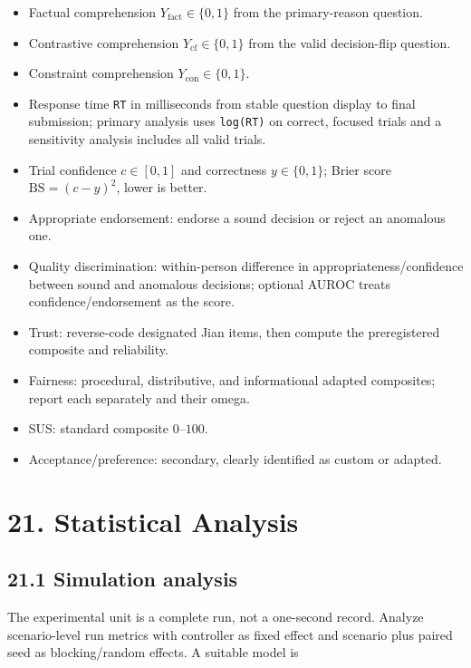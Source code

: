 \documentclass[
  english,
  11pt,
  a4paper,
]{article}
\providecommand{\tightlist}{%
  \setlength{\itemsep}{0pt}\setlength{\parskip}{0pt}}
\begin{document}
\begin{itemize}
\tightlist
\item
  Factual comprehension \(Y_{\mathrm{fact}}\in\{0,1\}\) from the primary-reason
  question.
\item
  Contrastive comprehension \(Y_{\mathrm{cf}}\in\{0,1\}\) from the valid
  decision-flip question.
\item
  Constraint comprehension \(Y_{\mathrm{con}}\in\{0,1\}\).
\item
  Response time \texttt{RT} in milliseconds from stable question display
  to final submission; primary analysis uses \texttt{log(RT)} on
  correct, focused trials and a sensitivity analysis includes all valid
  trials.
\item
  Trial confidence \(c\in[0,1]\) and correctness \(y\in\{0,1\}\); Brier
  score \(\mathrm{BS}=(c-y)^2\), lower is better.
\item
  Appropriate endorsement: endorse a sound decision or reject an
  anomalous one.
\item
  Quality discrimination: within-person difference in
  appropriateness/confidence between sound and anomalous decisions;
  optional AUROC treats confidence/endorsement as the score.
\item
  Trust: reverse-code designated Jian items, then compute the
  preregistered composite and reliability.
\item
  Fairness: procedural, distributive, and informational adapted
  composites; report each separately and their omega.
\item
  SUS: standard composite \(0\text{--}100\).
\item
  Acceptance/preference: secondary, clearly identified as custom or
  adapted.
\end{itemize}

\section{21. Statistical Analysis}\label{statistical-analysis}

\subsection{21.1 Simulation analysis}\label{simulation-analysis}

The experimental unit is a complete run, not a one-second record.
Analyze scenario-level run metrics with controller as fixed effect and
scenario plus paired seed as blocking/random effects. A suitable model
is
\end{document}
